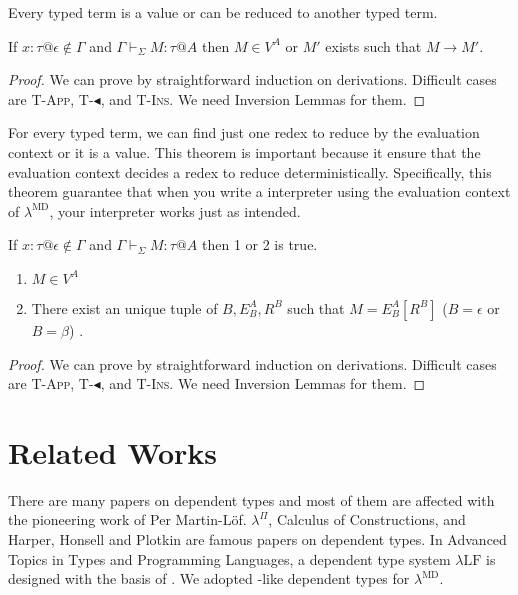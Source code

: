 \documentclass[runningheads]{llncs}
\newcommand{\LMD}{$\lambda^{\textrm{MD}}$\xspace}
\newcommand{\LLF}{$\lambda\textrm{LF}$\xspace}
\newcommand{\G}{\Gamma}
\newcommand{\V}{\vdash_\Sigma}
\newcommand{\TBL}{\blacktriangleleft}
\newcommand{\TApp}{\textsc{T-App}}
\newcommand{\TTBL}{\textsc{T-$\TBL$}}
\newcommand{\TIns}{\textsc{T-Ins}}
\begin{document}
Every typed term is a value or can be reduced to another typed term.
\begin{theorem}[Progress]
	If $x:\tau @\epsilon \notin \G$ and $\G \V M : \tau  @ A$ then
	$ M \in V^A $ or $M'$ exists such that $M \longrightarrow M'$.
\end{theorem}

\begin{proof}
	We can prove by straightforward induction on derivations.
	Difficult cases are \TApp, \TTBL, and \TIns.
	We need Inversion Lemmas for them.
\end{proof}

For every typed term, we can find just one redex to reduce by the evaluation context or it is a value.
This theorem is important because it ensure 
that the evaluation context decides a redex to reduce deterministically.
Specifically, this theorem guarantee that 
when you write a interpreter using the evaluation context of \LMD,
your interpreter works just as intended.

\begin{theorem}
	If $x:\tau @\epsilon \notin \G$ and $\G \V M : \tau @ A$ then 1 or 2 is true.
	\begin{enumerate}
		\item $ M \in V^A$
		\item There exist an unique tuple of $B, E^A_B, R^B$ such that $M = E^A_B[R^B]$ ($B = \epsilon$ or $B = \beta$) .
	\end{enumerate}
\end{theorem}

\begin{proof}
	We can prove by straightforward induction on derivations.
	Difficult cases are \TApp, \TTBL, and \TIns.
	We need Inversion Lemmas for them.
\end{proof}

\section{Related Works}


There are many papers on dependent types and most of them are affected with the pioneering work of Per Martin-L\"{o}f.
$\lambda^\Pi$\cite{Meyer1986}, Calculus of Constructions\cite{coquand:inria-00076024}, 
and Harper, Honsell and Plotkin\cite{harper1993framework} are famous papers on dependent types.
In Advanced Topics in Types and Programming Languages\cite{attapl},
a dependent type system \LLF is designed with the basis of \cite{harper1993framework}.
We adopted \cite{attapl}-like dependent types for \LMD.
\end{document}
